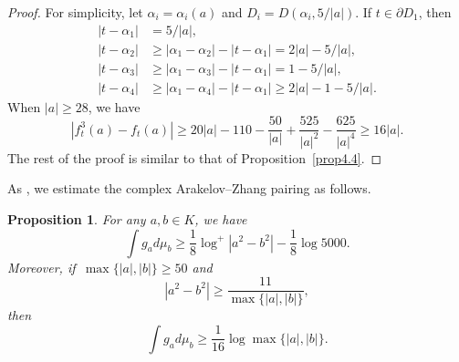 \documentclass[11pt]{amsart}
\numberwithin{equation}{section}
\theoremstyle{plain}
\newtheorem{prop}[thm]{Proposition}
\theoremstyle{definition}
\theoremstyle{remark}
\begin{document}
\begin{proof}
For simplicity, let $\alpha_{i}=\alpha_{i}(a)$ and $D_{i}=D(\alpha_{i},5/|a|)$.
If $t\in\partial D_{1}$, then
\begin{align*}
|t-\alpha_{1}| & =5/|a|,\\
|t-\alpha_{2}| & \geq|\alpha_{1}-\alpha_{2}|-|t-\alpha_{1}|=2|a|-5/|a|,\\
|t-\alpha_{3}| & \geq|\alpha_{1}-\alpha_{3}|-|t-\alpha_{1}|=1-5/|a|,\\
|t-\alpha_{4}| & \geq|\alpha_{1}-\alpha_{4}|-|t-\alpha_{1}|\geq2|a|-1-5/|a|.
\end{align*}
When $|a|\geq28$, we have
\[
\left|f_{t}^{3}(a)-f_{t}(a)\right|\geq20|a|-110-\frac{50}{|a|}+\frac{525}{|a|^{2}}-\frac{625}{|a|^{4}}\geq16|a|.
\]
The rest of the proof is similar to that of Proposition~\ref{prop4.4}.
\end{proof}

As \cite[Theorem 4.1]{DKY2}, we estimate the complex Arakelov--Zhang
pairing as follows.

\begin{prop}\label{prop4.6}
For any $a,b\in K$, we have
\[
\int g_{a}d\mu_{b}\geq\frac{1}{8}\log^{+}\left|a^{2}-b^{2}\right|-\frac{1}{8}\log5000.
\]
Moreover, if\, $\max\{|a|,|b|\}\geq50$ and
\begin{equation}
\left|a^{2}-b^{2}\right|\geq\frac{11}{\max\{|a|,|b|\}},\label{eq4.1}
\end{equation}
then
\[
\int g_{a}d\mu_{b}\geq\frac{1}{16}\log\max\{|a|,|b|\}.
\]
\end{prop}
\end{document}
